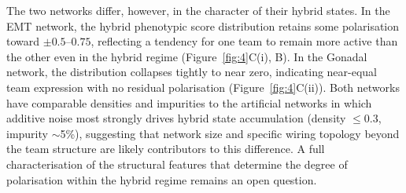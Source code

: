 \documentclass[11pt]{article}
\begin{document}
The two networks differ, however, in the character of their hybrid states. In the EMT network, the hybrid phenotypic score distribution retains some polarisation toward $\pm 0.5$--$0.75$, reflecting a tendency for one team to remain more active than the other even in the hybrid regime (Figure~\ref{fig:4}C(i), B). In the Gonadal network, the distribution collapses tightly to near zero, indicating near-equal team expression with no residual polarisation (Figure~\ref{fig:4}C(ii)). Both networks have comparable densities and impurities to the artificial networks in which additive noise most strongly drives hybrid state accumulation (density $\leq 0.3$, impurity $\sim$5\%), suggesting that network size and specific wiring topology beyond the team structure are likely contributors to this difference. A full characterisation of the structural features that determine the degree of polarisation within the hybrid regime remains an open question.



\end{document}
